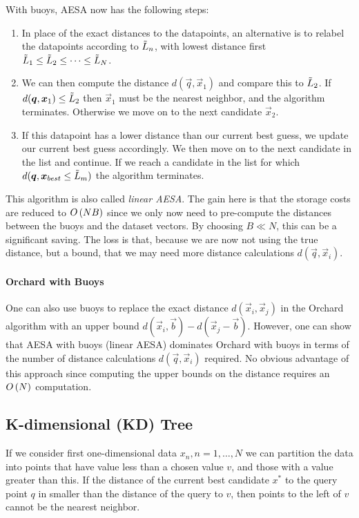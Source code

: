 With buoys, AESA now has the following steps:
\begin{enumerate}
	\item In place of the exact distances to the datapoints, an alternative is to relabel the datapoints according to $\tilde{L}_n$, with lowest distance first $\tilde{L}_1\leq\tilde{L}_2\leq\cdots\leq\tilde{L}_N$.
	\item We can then compute the distance $d(\vec{q},\vec{x}_1)$ and compare this to $\tilde{L}_2$. If $d(\boldsymbol{q},\boldsymbol{x}_1)\leq\tilde{L}_2$ then $\vec{x}_1$ must be the nearest neighbor, and the algorithm terminates. Otherwise we move on to the next candidate $\vec{x}_2$.
	\item If this datapoint has a lower distance than our current best guess, we update our current best guess accordingly. We then move on to the next candidate in the list and continue. If we reach a candidate in the list for which $d(\boldsymbol{q},\boldsymbol{x}_{best}\leq\tilde{L}_m)$ the algorithm terminates.
\end{enumerate}
This algorithm is also called \emph{linear AESA}. The gain here is that the storage costs are reduced to $O\left(NB\right)$ since we only now need to pre-compute the distances between the buoys and the dataset vectors. By choosing $B\ll N$, this can be a significant saving. The loss is that, because we are now not using the true distance, but a bound, that we may need more distance calculations $d(\vec{q},\vec{x}_i)$.

\paragraph{Orchard with Buoys}

One can also use buoys to replace the exact distance $d(\vec{x}_i,\vec{x}_j)$ in the Orchard algorithm with an upper bound $d(\vec{x}_i,\vec{b})-d(\vec{x}_j-\vec{b})$. However, one can show that AESA with buoys (linear AESA) dominates Orchard with buoys in terms of the number of distance calculations $d(\vec{q},\vec{x}_i)$ required. No obvious advantage of this approach since computing the upper bounds on the distance requires an $O\left(N\right)$ computation.

\subsection{K-dimensional (KD) Tree}

If we consider first one-dimensional data $x_n,n=1,\dotsc,N$ we can partition the data into points that have value less than a chosen value $v$, and those with a value greater than this. If the distance of the current best candidate $x^*$ to the query point $q$ in smaller than the distance of the query to $v$, then points to the left of $v$ cannot be the nearest neighbor.

